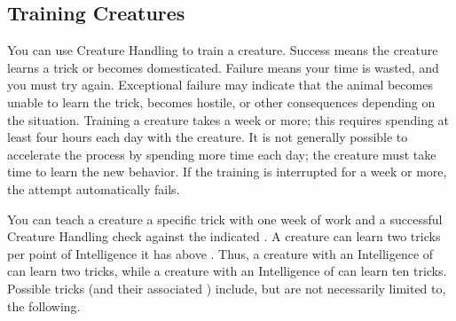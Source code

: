     \subsection{Training Creatures}\label{Training Creatures}
        You can use Creature Handling to train a creature. Success means the creature learns a trick or becomes domesticated. Failure means your time is wasted, and you must try again. Exceptional failure may indicate that the animal becomes unable to learn the trick, becomes hostile, or other consequences depending on the situation. Training a creature takes a week or more; this requires spending at least four hours each day with the creature. It is not generally possible to accelerate the process by spending more time each day; the creature must take time to learn the new behavior. If the training is interrupted for a week or more, the attempt automatically fails.

         You can teach a creature a specific trick with one week of work and a successful Creature Handling check against the indicated . A creature can learn two tricks per point of Intelligence it has above . Thus, a creature with an Intelligence of  can learn two tricks, while a creature with an Intelligence of  can learn ten tricks. Possible tricks (and their associated ) include, but are not necessarily limited to, the following.


